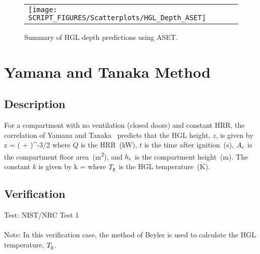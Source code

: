 \begin{figure}[!ht]
\begin{center}
\begin{tabular}{l}
\texttt{[image: SCRIPT\_FIGURES/Scatterplots/HGL\_Depth\_ASET]}
\end{tabular}
\end{center}
\caption[Summary of HGL depth predictions using ASET]
{Summary of HGL depth predictions using ASET.}
\label{HGL_Depth_ASET}
\end{figure}


\clearpage


\section{Yamana and Tanaka Method}

\subsection*{Description}

For a compartment with no ventilation (closed doors) and constant HRR, the correlation of Yamana and Tanaka~\cite{Tanaka:1} predicts that the HGL height, $z$, is given by
\be
z = \left(  +  \right)^{-3/2}
\label{eq:Yamana_Tanaka}
\ee
where $\dot Q$ is the HRR~(\si{kW}), $t$ is the time after ignition~(\si{s}), $A\sb{c}$ is the compartment floor area~(\si{m^2}), and $h\sb{c}$ is the compartment height~(\si{m}). The constant $k$ is given by
\be
k = 
\ee
where $T\sb{g}$ is the HGL temperature~(\si{K}).

\subsection*{Verification}

Test: NIST/NRC Test 1
\\ \\
\noindent Note: In this verification case, the method of Beyler is used to calculate the HGL temperature, $T\sb{g}$.


